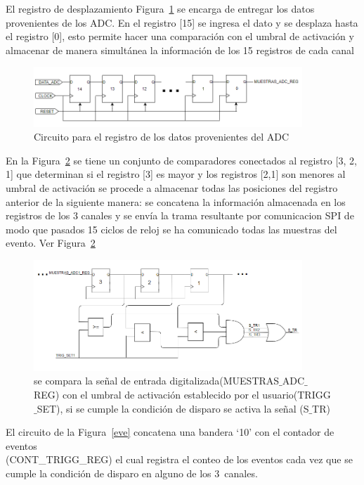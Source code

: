 El registro de desplazamiento Figura~\ref{desplazamiento} se encarga de entregar los datos provenientes de los ADC. En el registro [15] se ingresa el dato y se desplaza hasta el registro [0], esto permite hacer una comparación con el umbral de activación y  almacenar de manera simultánea la información de los 15 registros de cada canal


\begin{figure}[H]
\includegraphics[width=0.9\textwidth]{Figs/registro.PNG} 
\centering
\caption{Circuito para el registro de los datos provenientes del ADC}
\label{desplazamiento}
\end{figure}

En la Figura~\ref{detectorumbral} se tiene un conjunto de comparadores conectados al registro [3, 2, 1] que determinan si el registro [3] es mayor y los registros [2,1] son menores al umbral de activación se procede a almacenar todas las posiciones del registro anterior de la siguiente manera: se concatena la información almacenada en los registros de los 3 canales y se envía la trama resultante por comunicacion SPI de modo que pasados 15 ciclos de reloj se ha comunicado todas las muestras del evento. Ver Figura~\ref{detectorumbral}
\begin{figure}[H]
\includegraphics[width=0.9\textwidth]{Figs/COMPARA.PNG} 
\centering
\caption[Circuito de umbral de activación]{se compara la señal de entrada digitalizada(MUESTRAS$\_$ADC$\_$REG) con el umbral de activación establecido por el usuario(TRIGG$\_$SET),  si se cumple la condición de disparo se activa la señal (S$\_$TR)}
\label{detectorumbral}
\end{figure}

El circuito de la Figura~\ref{eve} concatena una bandera `10' con el contador de eventos\\ 
(CONT\_TRIGG\_REG) el cual registra el conteo de  los eventos cada vez que se cumple la condición de disparo en alguno de los 3~canales. 

